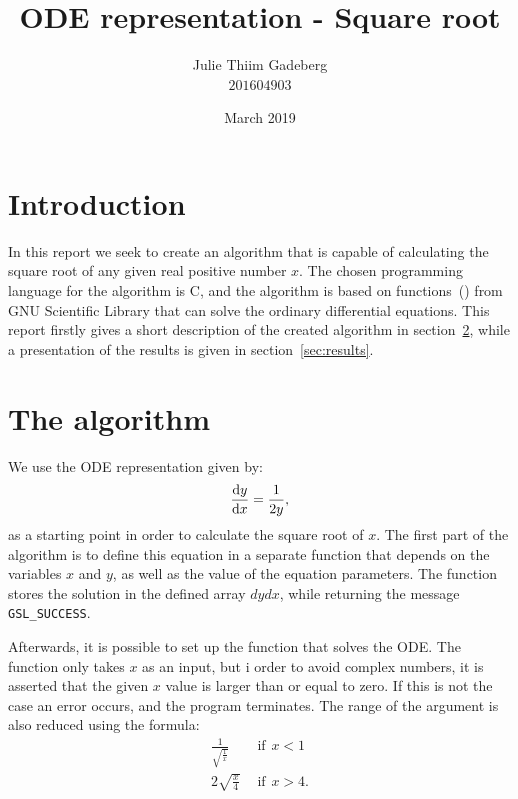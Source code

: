 \documentclass[12pt, twocolumn]{article}
\title{ODE representation - Square root}
\author{Julie Thiim Gadeberg \\ $201604903$}
\date{March 2019}
\begin{document}
\maketitle

\section{Introduction}

In this report we seek to create an algorithm that is capable of calculating the square root of any given real positive number $x$. The chosen programming language for the algorithm is C, and the algorithm is based on functions~(\cite{gsl}) from GNU Scientific Library that can solve the ordinary differential equations. This report firstly gives a short description of the created algorithm in section~\ref{sec:algorithm}, while a presentation of the results is given in section~\ref{sec:results}.

\section{The algorithm} \label{sec:algorithm}

We use the ODE representation given by:
\begin{equation}
    \frac{\textup{d}y}{\textup{d}x} = \frac{1}{2y},
\end{equation}
as a starting point in order to calculate the square root of $x$. The first part of the algorithm is to define this equation in a separate function that depends on the variables $x$ and $y$, as well as the value of the equation parameters. The function stores the solution in the defined array $dydx$, while returning the message \texttt{GSL\_SUCCESS}.

Afterwards, it is possible to set up the function that solves the ODE. The function only takes $x$ as an input, but i order to avoid complex numbers, it is asserted that the given $x$ value is larger than or equal to zero. If this is not the case an error occurs, and the program terminates. The range of the argument is also reduced using the formula:
\begin{align}
    \frac{1}{\sqrt{\frac{1}{x}}} \hspace{5pt} &\textrm{if} \hspace{5pt} x < 1\\
    2\sqrt{\frac{x}{4}} \hspace{5pt} &\textrm{if} \hspace{5pt} x > 4.
\end{align}
\end{document}
